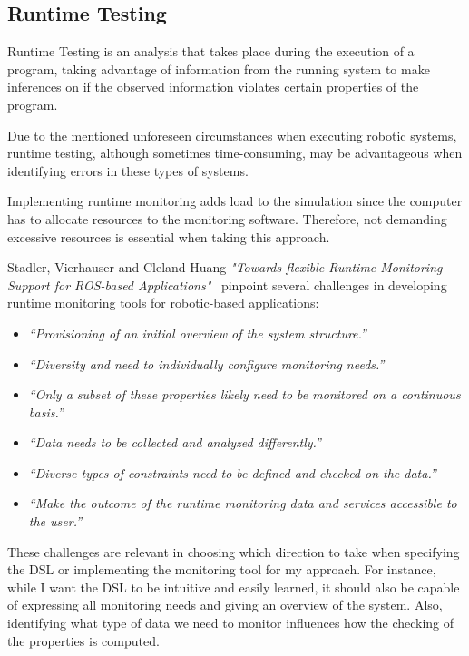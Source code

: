 \subsection{Runtime Testing}
\label{ssec:runtimetesting}

Runtime Testing is an analysis that takes place during the execution of a program, taking advantage of information from the running system to make inferences on if the observed information violates certain properties of the program.

Due to the mentioned unforeseen circumstances when executing robotic systems, runtime testing, although sometimes time-consuming, may be advantageous when identifying errors in these types of systems.

Implementing runtime monitoring adds load to the simulation since the computer has to allocate resources to the monitoring software. Therefore, not demanding excessive resources is essential when taking this approach.

Stadler, Vierhauser and Cleland-Huang \textit{"Towards flexible Runtime Monitoring Support for ROS-based Applications"}~\cite{stadler2022towards} pinpoint several challenges in developing runtime monitoring tools for robotic-based applications:

\begin{itemize}
    \item \textit{``Provisioning of an initial overview of the system structure.''}
    \item \textit{``Diversity and need to individually configure monitoring needs.''}
    \item \textit{``Only a subset of these properties likely need to be monitored on a continuous basis.''}
    \item \textit{``Data needs to be collected and analyzed differently.''}
    \item \textit{``Diverse types of constraints need to be defined and checked on the data.''}
    \item \textit{``Make the outcome of the runtime monitoring data and services accessible to the user.''}
\end{itemize}

These challenges are relevant in choosing which direction to take when specifying the DSL or implementing the monitoring tool for my approach. For instance, while I want the DSL to be intuitive and easily learned, it should also be capable of expressing all monitoring needs and giving an overview of the system. Also, identifying what type of data we need to monitor influences how the checking of the properties is computed.

